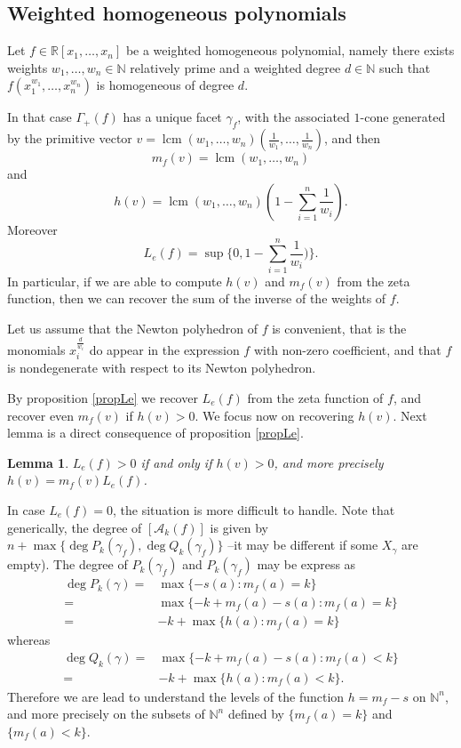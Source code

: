 \documentclass[12pt,a4paper,leqno]{amsart}
\newtheorem{lem}[thm]{Lemma}
\theoremstyle{definition}
\begin{document}
\subsection{Weighted homogeneous polynomials}\label{weight}

Let $f\in {\mathbb{R}}[x_1,\ldots,x_n]$ be a weighted homogeneous polynomial, namely there exists weights
$w_1,\ldots,w_n\in {\mathbb{N}}$ relatively prime and a weighted degree $d\in
{\mathbb{N}}$ such that $f(x_1^{w_1},\ldots,x_n^{w_n})$ is homogeneous of
degree $d$. 

In that case $\Gamma_+ (f)$ has a unique facet $\gamma_f$,
with the associated $1$-cone generated by the primitive vector $v={\mathop{\mathrm{lcm}}\nolimits}
(w_1,\ldots,w_n)(\frac{1}{w_1},\ldots, \frac{1}{w_n})$, and then 
$$m_f(v)={\mathop{\mathrm{lcm}}\nolimits} (w_1,\ldots,w_n)$$
and 
$$h(v)={\mathop{\mathrm{lcm}}\nolimits}
(w_1,\ldots,w_n)(1-\sum_{i=1}^n \frac{1}{w_i}).$$ 
Moreover 
$$L_e(f)=\sup
\{0, 1-\sum_{i=1}^n \frac{1}{w_i})\}.$$
In particular, if we
are able to compute $h(v)$ and $m_f(v)$ from the zeta function, then we can recover the sum of
the inverse of the weights of $f$.

Let us assume that the Newton polyhedron of $f$ is
convenient, that is the monomials $x_i^{\frac{d}{w_i}}$ do appear in
the expression $f$ with non-zero coefficient, and that $f$ is nondegenerate with
respect to its Newton polyhedron. 

By proposition \ref{propLe} we
recover $L_e(f)$ from the zeta function of
$f$, and recover even $m_f(v)$ if $h(v)>0$. We
focus now on recovering $h(v)$. Next lemma is a direct consequence of proposition \ref{propLe}.

\begin{lem} $L_e(f)>0$ if and only if $h(v)>0$, and more precisely $h(v)=m_f(v)L_e(f)$.
\end{lem}
  
In case $L_e(f)=0$, the situation is more difficult to handle. Note
that generically, the degree of $[\mathcal A_k(f)]$ is given by $n+\max \{\deg
P_k(\gamma_f),\deg Q_k(\gamma_f)\}$ --it may be different if some
$X_{\gamma}$ are empty). The degree of $P_k(\gamma_f)$ and
$P_k(\gamma_f)$ may be express as
\begin{align*}
\deg P_k(\gamma)
=&\max \{-s(a): m_f(a)=k\} \\ 
=&\max \{-k+m_f(a)-s(a):
m_f(a)=k\}\\
=&-k+\max \{h(a):m_f(a)=k\}
\end{align*}
whereas 
\begin{align*}
\deg Q_k(\gamma)
=&\max \{-k+m_f(a)-s(a):m_f(a)<k\}\\ 
=&-k+\max \{h(a):m_f(a)<k\}.
\end{align*}
Therefore we are lead to understand the levels of the
function $h=m_f-s$ on $\mathbb N^n$, and more precisely on the subsets
of $\mathbb N^n$ defined by $\{m_f(a)=k\}$ and $\{m_f(a)<k\}$.
\end{document}
